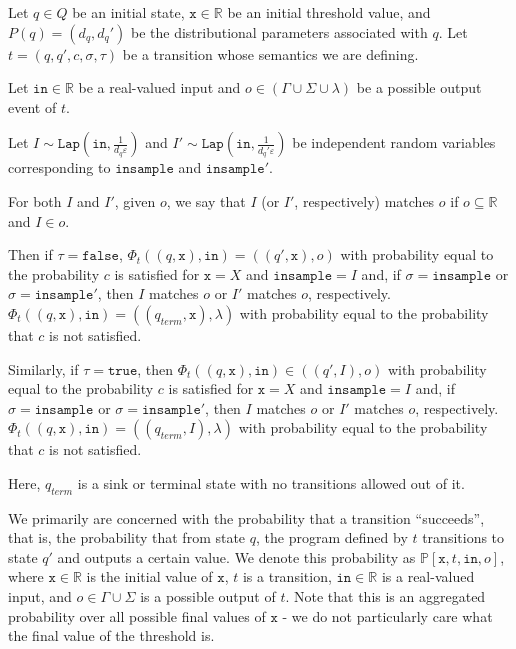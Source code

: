 \documentclass[12pt]{article}
\newcommand{\RR}{\mathbb{R}}
\newcommand{\PP}{\mathbb{P}}
\newcommand{\Lap}{\texttt{Lap}}
\theoremstyle{definition}
\begin{document}
Let $q\in Q$ be an initial state, $\texttt{x}\in \RR$ be an initial threshold value, and $P(q) = (d_q, d_q')$ be the distributional parameters associated with $q$. Let $t = (q, q', c, \sigma, \tau)$ be a transition whose semantics we are defining. 

Let $\texttt{in}\in \RR$ be a real-valued input and $o\in (\Gamma\cup\Sigma\cup\lambda)$ be a possible output event of $t$.

Let $I\sim \Lap(\texttt{in}, \frac{1}{d_q\varepsilon})$ and $I'\sim \Lap(\texttt{in}, \frac{1}{d_q'\varepsilon})$ be independent random variables corresponding to $\texttt{insample}$ and $\texttt{insample}'$. 

For both $I$ and $I'$, given $o$, we say that $I$ (or $I'$, respectively) matches $o$ if $o\subseteq \RR$ and $I\in o$. 

Then if $\tau = \texttt{false}$, $\Phi_t((q, \texttt{x}), \texttt{in}) = ((q', \texttt{x}), o)$ with probability equal to the probability $c$ is satisfied for $\texttt{x} = X$ and $\texttt{insample} = I$ and, if $\sigma = \texttt{insample}$ or $\sigma = \texttt{insample}'$, then $I$ matches $o$ or $I'$ matches $o$, respectively. $\Phi_t((q, \texttt{x}), \texttt{in}) = ((q_{term}, \texttt{x}), \lambda)$ with probability equal to the probability that $c$ is not satisfied. 

Similarly, if $\tau = \texttt{true}$, then $\Phi_t((q, \texttt{x}), \texttt{in}) \in ((q', I), o)$ with probability equal to the probability $c$ is satisfied for $\texttt{x} = X$ and $\texttt{insample} =I$ and,
if $\sigma = \texttt{insample}$ or $\sigma = \texttt{insample}'$, then $I$ matches $o$ or $I'$ matches $o$, respectively. $\Phi_t((q, \texttt{x}), \texttt{in}) = ((q_{term}, I), \lambda)$ with probability equal to the probability that $c$ is not satisfied. 

Here, $q_{term}$ is a sink or terminal state with no transitions allowed out of it.

We primarily are concerned with the probability that a transition ``succeeds'', that is, the probability that from state $q$, the program defined by $t$ transitions to state $q'$ and outputs a certain value. We denote this probability as $\PP[\texttt{x}, t, \texttt{in}, o]$, where $\texttt{x} \in \RR$ is the initial value of $\texttt{x}$, $t$ is a transition, $\texttt{in}\in \RR$ is a real-valued input, and $o\in \Gamma\cup\Sigma$ is a possible output of $t$.
Note that this is an aggregated probability over all possible final values of $\texttt{x}$ - we do not particularly care what the final value of the threshold is. 
\end{document}
